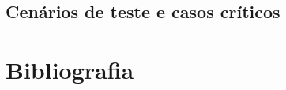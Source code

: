 \documentclass[12pt]{article}
\begin{document}
\subsection{Cenários de teste e casos críticos}
\paragraph{}

\newpage
\section{Bibliografia}


\end{document}
